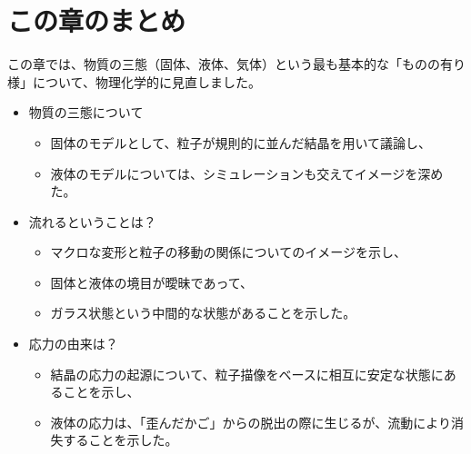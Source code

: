 \documentclass[uplatex,dvipdfmx,a4paper,11pt]{jsarticle}
\begin{document}
\section*{この章のまとめ}
この章では、物質の三態（固体、液体、気体）という最も基本的な「ものの有り様」について、物理化学的に⾒直しました。
\begin{boxnote}
	\large
    \begin{itemize}
		\item 物質の三態について
		\begin{itemize}
			\item 固体のモデルとして、粒子が規則的に並んだ結晶を用いて議論し、
			\item 液体のモデルについては、シミュレーションも交えてイメージを深めた。
		\end{itemize} 
		\item 流れるということは？
		\begin{itemize}
			\item マクロな変形と粒子の移動の関係についてのイメージを示し、
			\item 固体と液体の境目が曖昧であって、
			\item ガラス状態という中間的な状態があることを示した。
		\end{itemize} 
		\item 応力の由来は？
		\begin{itemize}
			\item 結晶の応力の起源について、粒子描像をベースに相互に安定な状態にあることを示し、
			\item 液体の応力は、「歪んだかご」からの脱出の際に生じるが、流動により消失することを示した。
		\end{itemize}
	\end{itemize}
\end{boxnote}

\newpage
\end{document}
